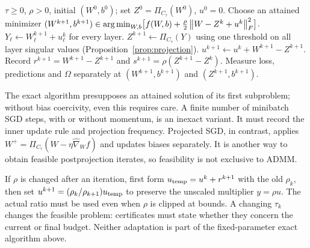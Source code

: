 \begin{algorithm}[htbp]
\caption{Exact ADMM step for a global nuclear-norm budget}\label{alg:admm}
\begin{algorithmic}[1]
\Require $\tau\ge0$, $\rho>0$, initial $(W^0,b^0)$; set $Z^0=\Pi_{C_\tau}(W^0)$, $u^0=0$.
\State Choose an attained minimizer
\Statex\hspace{1em} $ (W^{k+1},b^{k+1})\in\operatorname*{arg\,min}_{W,b}\bigl[f(W,b)+\frac\rho2\left\lVert W-Z^k+u^k\right\rVert_F^2\bigr]$.
\State $Y_\ell\gets W_\ell^{k+1}+u_\ell^k$ for every layer.
\State $Z^{k+1}\gets\Pi_{C_\tau}(Y)$ using one threshold on all layer singular values (Proposition~\ref{prop:projection}).
\State $u^{k+1}\gets u^k+W^{k+1}-Z^{k+1}$.
\State Record $r^{k+1}=W^{k+1}-Z^{k+1}$ and $s^{k+1}=\rho(Z^{k+1}-Z^k)$.
\State Measure loss, predictions and $\Omega$ separately at $(W^{k+1},b^{k+1})$ and $(Z^{k+1},b^{k+1})$.
\EndFor
\end{algorithmic}
\end{algorithm}
The exact algorithm presupposes an attained solution of its first subproblem; without bias coercivity, even this requires care. A finite number of minibatch SGD steps, with or without momentum, is an inexact variant. It must record the inner update rule and projection frequency. Projected SGD, in contrast, applies $W^+=\Pi_{C_\tau}(W-\eta\widehat\nabla_W f)$ and updates biases separately. It is another way to obtain feasible postprojection iterates, so feasibility is not exclusive to ADMM.

If $\rho$ is changed after an iteration, first form $u_{\rm temp}=u^k+r^{k+1}$ with the old $\rho_k$, then set $u^{k+1}=(\rho_k/\rho_{k+1})u_{\rm temp}$ to preserve the unscaled multiplier $y=\rho u$. The actual ratio must be used even when $\rho$ is clipped at bounds. A changing $\tau_k$ changes the feasible problem: certificates must state whether they concern the current or final budget. Neither adaptation is part of the fixed-parameter exact algorithm above.

